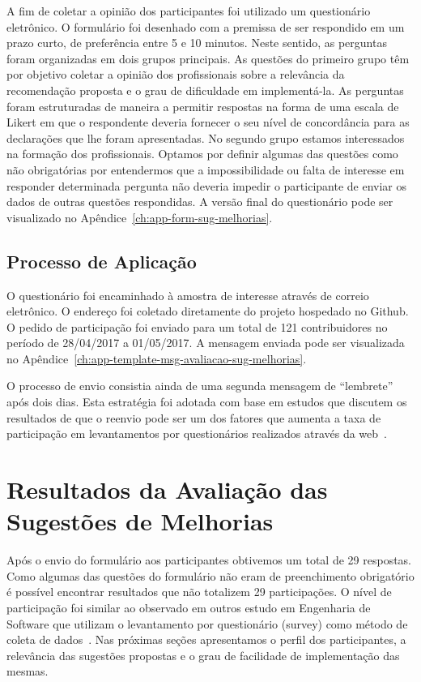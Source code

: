 A fim de coletar a opinião dos participantes foi utilizado um questionário
eletrônico. O formulário foi desenhado com a premissa de ser respondido em um
prazo curto, de preferência entre 5 e 10 minutos. Neste sentido, as perguntas
foram organizadas em dois grupos principais. As questões do primeiro grupo têm
por objetivo coletar a opinião dos profissionais sobre a relevância da
recomendação proposta e o grau de dificuldade em implementá-la. As perguntas
foram estruturadas de maneira a permitir respostas na forma de uma escala de
Likert em que o respondente deveria fornecer o seu nível de concordância para
as declarações que lhe foram apresentadas. No segundo grupo estamos
interessados na formação dos profissionais. Optamos por definir algumas das
questões como não obrigatórias por entendermos que a impossibilidade ou falta
de interesse em responder determinada pergunta não deveria impedir o
participante de enviar os dados de outras questões respondidas. A versão final
do questionário pode ser visualizado no
Apêndice~\ref{ch:app-form-sug-melhorias}.

\subsection{Processo de Aplicação}\label{ssub:processo_de_aplicação}

O questionário foi encaminhado à amostra de interesse através de correio
eletrônico. O endereço foi coletado diretamente do projeto hospedado no Github.
O pedido de participação foi enviado para um total de 121 contribuidores no
período de 28/04/2017 a 01/05/2017. A mensagem enviada pode ser visualizada no
Apêndice~\ref{ch:app-template-msg-avaliacao-sug-melhorias}.

O processo de envio consistia ainda de uma segunda mensagem de ``lembrete''
após dois dias. Esta estratégia foi adotada com base em estudos que discutem os
resultados de que o reenvio pode ser um dos fatores que aumenta a taxa de
participação em levantamentos por questionários realizados através da
web~\cite{fan2010factors}.

\section{Resultados da Avaliação das Sugestões de Melhorias}\label{sec:resultados_avaliacao_sug_de_melhorias}

Após o envio do formulário aos participantes obtivemos um total de 29
respostas.  Como algumas das questões do formulário não eram de preenchimento
obrigatório é possível encontrar resultados que não totalizem 29 participações.
O nível de participação foi similar ao observado em outros estudo em Engenharia
de Software que utilizam o levantamento por questionário (survey) como método
de coleta de dados~\cite{fan2010factors}. Nas próximas seções apresentamos o
perfil dos participantes, a relevância das sugestões propostas e o grau de
facilidade de implementação das mesmas.


